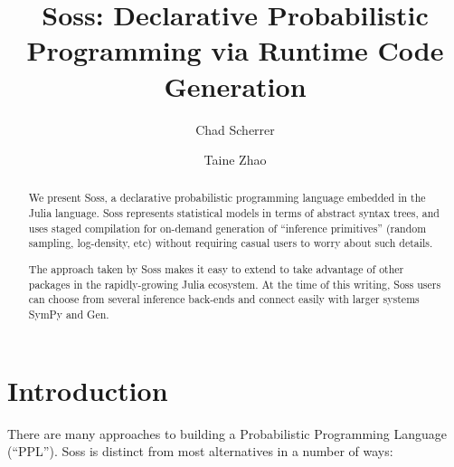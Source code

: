 \documentclass[anonymous=false, %
               format=acmsmall, %
               review=true, %
               screen=true, %
               nonacm=true]{acmart}
\begin{document}
\title{Soss: Declarative Probabilistic Programming via Runtime Code Generation}

\author{Chad Scherrer}

\author{Taine Zhao}

\begin{abstract}
We present Soss, a declarative probabilistic programming language embedded in the Julia language. Soss represents statistical models in terms of abstract syntax trees, and uses staged compilation for on-demand generation of ``inference primitives'' (random sampling, log-density, etc) without requiring casual users to worry about such details.

The approach taken by Soss makes it easy to extend to take advantage of other packages in the rapidly-growing Julia ecosystem. At the time of this writing, Soss users can choose from several inference back-ends and connect easily with larger systems SymPy and Gen.
\end{abstract}

\maketitle

\section{Introduction}

There are many approaches to building a Probabilistic Programming Language (``PPL''). Soss is distinct from most alternatives in a number of ways:
\end{document}
